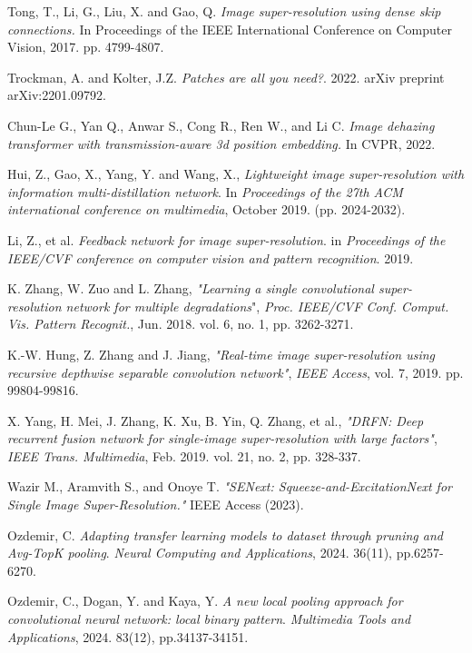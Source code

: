 \documentclass[twocolumn]{svjour3}          %
\begin{document}
\begin{thebibliography}{00}
 Tong, T., Li, G., Liu, X. and Gao, Q. \textit{Image super-resolution using dense skip connections.} In Proceedings of the IEEE International Conference on Computer Vision, 2017. pp. 4799-4807. 

 Trockman, A. and Kolter, J.Z. \textit{Patches are all you need?}.  2022. arXiv preprint arXiv:2201.09792.

 Chun-Le G., Yan Q., Anwar S., Cong R., Ren W., and Li C. \textit{Image dehazing transformer with transmission-aware 3d position embedding.} In CVPR, 2022.

 Hui, Z., Gao, X., Yang, Y. and Wang, X., \textit{Lightweight image super-resolution with information multi-distillation network}. In \textit{Proceedings of the 27th ACM international conference on multimedia}, October 2019. (pp. 2024-2032).

 Li, Z., et al. \textit{Feedback network for image super-resolution}. in \textit{Proceedings of the IEEE/CVF conference on computer vision and pattern recognition}. 2019.

 K. Zhang, W. Zuo and L. Zhang, \textit{"Learning a single convolutional super-resolution network for multiple degradations}", \textit{Proc. IEEE/CVF Conf. Comput. Vis. Pattern Recognit.}, Jun. 2018. vol. 6, no. 1, pp. 3262-3271.

 K.-W. Hung, Z. Zhang and J. Jiang, \textit{"Real-time image super-resolution using recursive depthwise separable convolution network"}, \textit{IEEE Access}, vol. 7, 2019. pp. 99804-99816.

 X. Yang, H. Mei, J. Zhang, K. Xu, B. Yin, Q. Zhang, et al., \textit{"DRFN: Deep recurrent fusion network for single-image super-resolution with large factors"}, \textit{IEEE Trans. Multimedia}, Feb. 2019. vol. 21, no. 2, pp. 328-337.

 Wazir M., Aramvith S., and Onoye T. \textit{"SENext: Squeeze-and-ExcitationNext for Single Image Super-Resolution." }IEEE Access (2023).

 Ozdemir, C. \textit{Adapting transfer learning models to dataset through pruning and Avg-TopK pooling}. \textit{Neural Computing and Applications}, 2024. 36(11), pp.6257-6270.

 Ozdemir, C., Dogan, Y. and Kaya, Y. \textit{A new local pooling approach for convolutional neural network: local binary pattern}. \textit{Multimedia Tools and Applications}, 2024. 83(12), pp.34137-34151.


\end{thebibliography}
\end{document}
